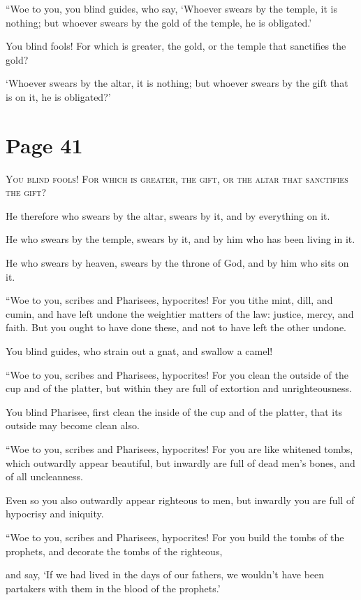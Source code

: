 “Woe to you, you blind guides, who say, ‘Whoever swears by the temple, it is nothing; but whoever swears by the gold of the temple, he is obligated.’

You blind fools! For which is greater, the gold, or the temple that sanctifies the gold?

‘Whoever swears by the altar, it is nothing; but whoever swears by the gift that is on it, he is obligated?’



\chapterornament
\section*{Page 41}

\lettrine{Y}{ou blind fools! For which is greater, the gift, or the altar that sanctifies the gift?}

He therefore who swears by the altar, swears by it, and by everything on it.

He who swears by the temple, swears by it, and by him who has been living in it.

He who swears by heaven, swears by the throne of God, and by him who sits on it.

“Woe to you, scribes and Pharisees, hypocrites! For you tithe mint, dill, and cumin, and have left undone the weightier matters of the law: justice, mercy, and faith. But you ought to have done these, and not to have left the other undone.

You blind guides, who strain out a gnat, and swallow a camel!

“Woe to you, scribes and Pharisees, hypocrites! For you clean the outside of the cup and of the platter, but within they are full of extortion and unrighteousness.

You blind Pharisee, first clean the inside of the cup and of the platter, that its outside may become clean also.

“Woe to you, scribes and Pharisees, hypocrites! For you are like whitened tombs, which outwardly appear beautiful, but inwardly are full of dead men’s bones, and of all uncleanness.

Even so you also outwardly appear righteous to men, but inwardly you are full of hypocrisy and iniquity.

“Woe to you, scribes and Pharisees, hypocrites! For you build the tombs of the prophets, and decorate the tombs of the righteous,

and say, ‘If we had lived in the days of our fathers, we wouldn’t have been partakers with them in the blood of the prophets.’

